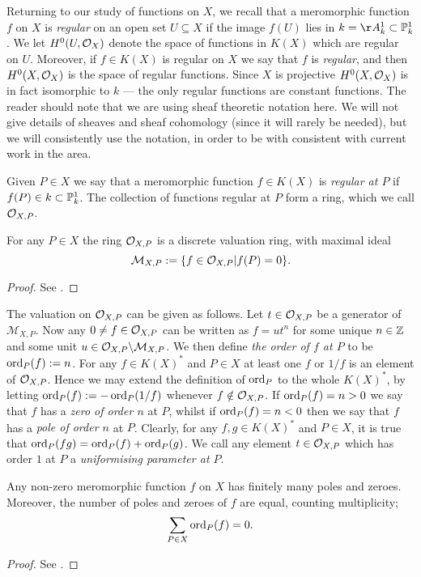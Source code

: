 Returning to our study of functions on $X$, we recall that a meromorphic function $f$ on $X$ is \emph{regular} on an open set $U \subseteq X$ if the image $f(U)$ lies in $k = \AA_k^1 \subset \PP_k^1$.
We let $H^0(U,{\cal O}_X)$ denote the space of functions in $K(X)$ which are regular on $U$.
Moreover, if $f \in K(X)$ is regular on $X$ we say that $f$ is \emph{regular}, and then $H^0(X,{\cal O}_X)$ is the space of regular functions.
Since $X$ is projective $H^0(X,{\cal O}_X)$ is in fact isomorphic to $k$ --- \ie the only regular functions are constant functions.
The reader should note that we are using sheaf theoretic notation here. 
We will not give details of sheaves and sheaf cohomology (since it will rarely be needed), but we will consistently use the notation, in order to be with consistent with current work in the area.

Given $P \in X$ we say that a meromorphic function $f \in K(X)$ is \emph{regular at $P$} if $f(P) \in k \subset {\mathbb P}_k^1$.
The collection of functions regular at $P$ form a ring, which we call ${\cal O}_{X,P}$.

    \begin{lem}
    For any $P \in X$ the ring ${\cal O}_{X,P}$ is a discrete valuation ring, with maximal ideal
        \[
        \mathcal {M}_{X,P} := \{ f \in {\cal O}_{X,P} | f(P) = 0 \}.
        \]
    \end{lem}
    \begin{proof}
    See \cite[Chap.\ 1, \S 4]{fulton}.
    \end{proof}

The valuation on ${\cal O}_{X,P}$ can be given as follows.
Let $t \in {\cal O}_{X,P}$ be a generator of $\mathcal{M}_{X,P}$.
Now any $0 \neq f \in {\cal O}_{X,P}$ can be written as $f = ut^n$ for some unique $n \in {\mathbb Z}$ and some unit $u \in {\cal O}_{X,P}\backslash \mathcal{M}_{X,P}$.
We then define \emph{the order of $f$ at $P$} to be $\operatorname{ord}_P(f) := n$.
For any $f \in K(X)^*$ and $P \in X$ at least one $f$ or $1/f$ is an element of $ {\cal O}_{X,P}$.
Hence we may extend the definition of $\operatorname{ord}_P$ to the whole $K(X)^*$, by letting $\operatorname{ord}_P(f) := - \operatorname{ord}_P(1/f)$ whenever $f \notin {\cal O}_{X,P}$.
If $\operatorname{ord}_P(f) = n >0$ we say that $f$ has a \emph{zero of order $n$} at $P$, whilst if $\operatorname{ord}_P(f) = n < 0$ then we say that $f$ has a \emph{pole of order $n$} at $P$.
Clearly, for any $f, g \in K(X)^*$ and $P \in X$, it is true that $\operatorname{ord}_P(fg) = \operatorname{ord}_P(f) + \operatorname{ord}_P(g)$.
We call any element $t \in {\cal O}_{X,P}$ which has order $1$ at $P$ a \emph{uniformising parameter at $P$}.

    \begin{prop}\label{propfinitelymanyzeroesandpoles}
    Any non-zero meromorphic function $f$ on $X$ has finitely many poles and zeroes.
    Moreover, the number of poles and zeroes of $f$ are equal, counting multiplicity; \ie 
        \[
        \sum_{P \in X} \operatorname{ord}_P(f) = 0.
        \]
    \end{prop}
    \begin{proof}
    See \cite[Chap.\ 8, \S 1, Prop.\ 1]{fulton}.
    \end{proof}


